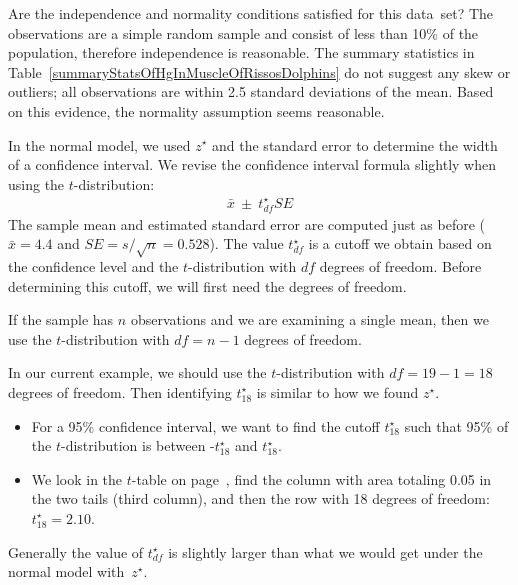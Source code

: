 \begin{example}{Are the independence and normality conditions satisfied for this data~set?}
The observations are a simple random sample and consist of less than 10\% of the population, therefore independence is reasonable. The summary statistics in Table~\ref{summaryStatsOfHgInMuscleOfRissosDolphins} do not suggest any skew or outliers; all observations are within 2.5 standard deviations of the mean. Based on this evidence, the normality assumption seems reasonable.
\end{example}

In the normal model, we used $z^{\star}$ and the standard error to determine the width of a confidence interval. We revise the confidence interval formula slightly when using the $t$-distribution:
\begin{eqnarray*}
\bar{x} \ \pm\  t^{\star}_{df}SE
\end{eqnarray*}
The sample mean and estimated standard error are computed just as before ($\bar{x} = 4.4$ and $SE = s/\sqrt{n} = 0.528$). The value $t^{\star}_{df}$ is a cutoff we obtain based on the confidence level and the $t$-distribution with $df$ degrees of freedom. Before determining this cutoff, we will first need the degrees of freedom.

\begin{termBox}{
If the sample has $n$ observations and we are examining a single mean, then we use the $t$-distribution with $df=n-1$ degrees of freedom.}
\end{termBox}

In our current example, we should use the $t$-distribution with $df=19-1=18$ degrees of freedom. Then identifying $t_{18}^{\star}$ is similar to how we found $z^{\star}$. 
\begin{itemize}
\setlength{\itemsep}{0mm}
\item For a 95\% confidence interval, we want to find the cutoff $t^{\star}_{18}$ such that 95\% of the $t$-distribution is between -$t^{\star}_{18}$ and $t^{\star}_{18}$.
\item We look in the $t$-table on page~\pageref{tTableSample}, find the column with area totaling 0.05 in the two tails (third column), and then the row with 18 degrees of freedom: $t^{\star}_{18} = 2.10$.
\end{itemize}
Generally the value of $t^{\star}_{df}$ is slightly larger than what we would get under the normal model with~$z^{\star}$.




